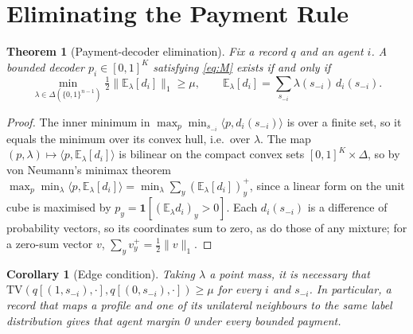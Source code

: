 \documentclass[sigconf,anonymous,acmthm=false]{acmart}
\theoremstyle{acmplain}
\newtheorem{theorem}{Theorem}
\newtheorem{corollary}{Corollary}
\theoremstyle{acmdefinition}
\newcommand{\E}{\mathbb{E}}
\newcommand{\TV}{\mathrm{TV}}
\newcommand{\cube}{\{0,1\}}
\begin{document}
\section{Eliminating the Payment Rule}\label{sec:elim}

\begin{theorem}[Payment-decoder elimination]\label{thm:elim}
Fix a record $q$ and an agent $i$. A bounded decoder $p_i\in[0,1]^K$ satisfying
\eqref{eq:M} exists if and only if
\[ \min_{\lambda\in\Delta(\cube^{n-1})}\tfrac12\big\|\E_\lambda[d_i]\big\|_1\ge\mu,
\qquad\E_\lambda[d_i]=\textstyle\sum_{s_{-i}}\lambda(s_{-i})\,d_i(s_{-i}). \]
\end{theorem}

\begin{proof}
The inner minimum in $\max_p\min_{s_{-i}}\langle p,d_i(s_{-i})\rangle$ is over a finite set,
so it equals the minimum over its convex hull, i.e.\ over $\lambda$. The map
$(p,\lambda)\mapsto\langle p,\E_\lambda[d_i]\rangle$ is bilinear on the compact convex sets
$[0,1]^K\times\Delta$, so by von Neumann's minimax theorem
$\max_p\min_\lambda\langle p,\E_\lambda[d_i]\rangle=\min_\lambda\sum_y(\E_\lambda[d_i])_y^+$,
since a linear form on the unit cube is maximised by $p_y=\mathbf1[(\E_\lambda d_i)_y>0]$.
Each $d_i(s_{-i})$ is a difference of probability vectors, so its coordinates sum to zero,
as do those of any mixture; for a zero-sum vector $v$, $\sum_yv_y^+=\frac12\|v\|_1$.
\end{proof}

\begin{corollary}[Edge condition]\label{cor:edge}
Taking $\lambda$ a point mass, it is necessary that
$\TV(q[(1,s_{-i}),\cdot],q[(0,s_{-i}),\cdot])\ge\mu$ for every $i$ and $s_{-i}$. In
particular, a record that maps a profile and one of its unilateral neighbours to the same
label distribution gives that agent margin 0 under every bounded payment.
\end{corollary}
\end{document}

